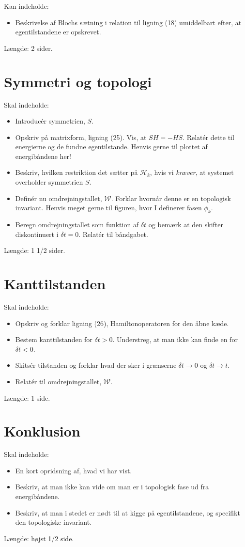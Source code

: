 \documentclass[10pt]{article}
\begin{document}
Kan indeholde:
\begin{itemize}
\item Beskrivelse af Blochs sætning i relation til ligning (18) umiddelbart efter, at egentilstandene er opskrevet. 
\end{itemize}

Længde: 2 sider. 

\section{Symmetri og topologi}
Skal indeholde:
\begin{itemize}
\item Introducér symmetrien, $S$. 
\item Opskriv på matrixform, ligning (25). Vis, at $SH = -HS$. Relatér dette til energierne og de fundne egentilstande. Henvis gerne til plottet af energibåndene her! 
\item Beskriv, hvilken restriktion det sætter på $\mathcal{H}_k$, hvis vi \textit{kræver}, at systemet overholder symmetrien $S$. 
\item Definér nu omdrejningstallet, $\mathcal{W}$. Forklar hvornår denne er en topologisk invariant. Henvis meget gerne til figuren, hvor I definerer fasen $\phi_k$. 
\item Beregn omdrejningstallet som funktion af $\delta t$ og bemærk at den skifter diskontinuert i $\delta t = 0$. Relatér til båndgabet. 
\end{itemize}

Længde: 1 1/2 sider. 


\section{Kanttilstanden}
Skal indeholde:
\begin{itemize}
\item Opskriv og forklar ligning (26), Hamiltonoperatoren for den åbne kæde. 
\item Bestem kanttilstanden for $\delta t > 0$. Understreg, at man ikke kan finde en for $\delta t < 0$. 
\item Skitsér tilstanden og forklar hvad der sker i grænserne $\delta t \to 0$ og $\delta t \to t$. 
\item Relatér til omdrejningstallet, $\mathcal{W}$. 
\end{itemize}

Længde: 1 side. 


\section{Konklusion}
Skal indeholde:
\begin{itemize}
\item En kort opridsning af, hvad vi har vist. 
\item Beskriv, at man ikke kan vide om man er i topologisk fase ud fra energibåndene. 
\item Beskriv, at man i stedet er nødt til at kigge på egentilstandene, og specifikt den topologiske invariant. 
\end{itemize}

Længde: højst 1/2 side. 
\end{document}
